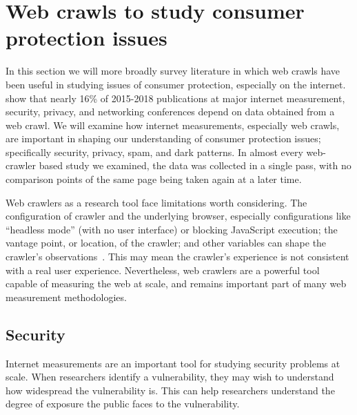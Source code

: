 \section{Web crawls to study consumer protection issues} \label{sec:background:crawls}
In this section we will more broadly survey literature in which web crawls have been useful in studying issues of consumer protection, especially on the internet. \citet{ahmad2020apophanies} show that nearly 16\% of 2015-2018 publications at major internet measurement, security, privacy, and networking conferences depend on data obtained from a web crawl. We will examine how internet measurements, especially web crawls, are important in shaping our understanding of consumer protection issues; specifically security, privacy, spam, and dark patterns. In almost every web-crawler based study we examined, the data was collected in a single pass, with no comparison points of the same page being taken again at a later time.

Web crawlers as a research tool face limitations worth considering. The configuration of crawler and the underlying browser, especially configurations like ``headless mode'' (with no user interface) or blocking JavaScript execution; the vantage point, or location, of the crawler; and other variables can shape the crawler's observations~\cite{jueckstock2021towards}. This may mean the crawler's experience is not consistent with a real user experience. Nevertheless, web crawlers are a powerful tool capable of measuring the web at scale, and remains important part of many web measurement methodologies.

\subsection{Security}
Internet measurements are an important tool for studying security problems at scale. When researchers identify a vulnerability, they may wish to understand how widespread the vulnerability is. This can help researchers understand the degree of exposure the public faces to the vulnerability.

